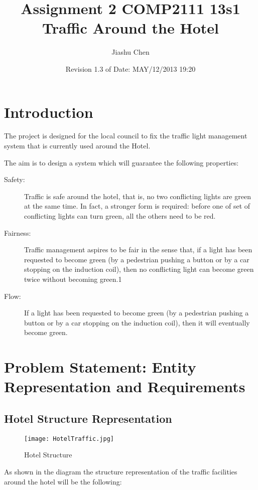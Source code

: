 \documentclass[a4paper]{article}
\title{\textbf{Assignment 2 COMP2111 13s1\\Traffic Around the Hotel}}
\author{Jiashu Chen\\
}
\date{Revision 1.3 of Date: MAY/12/2013 19:20}
\begin{document}
\thispagestyle{empty}
\maketitle
\tableofcontents
\newpage
\setcounter{page}{1}
\section{Introduction}

\indent\indent The project is designed for the local council to fix the traffic light management system that is currently used around the Hotel.

The aim is to design a system which will guarantee the following properties:
\begin{description}
\item [Safety:] Traffic is safe around the hotel, that is, no two conflicting lights are green at the same time. In fact, a stronger form is required: before one of set of conflicting lights can turn green, all the others need to be red.
\item [Fairness:] Traffic management aspires to be fair in the sense that, if a light has been requested to become green (by a pedestrian pushing a button or by a car stopping on the induction coil), then no conflicting light can become green twice without becoming green.1
\item [Flow:] If a light has been requested to become green (by a pedestrian pushing a button or by a car stopping on the induction coil), then it will eventually become green.
\end{description}

\section{Problem Statement: Entity Representation and Requirements}
\subsection{Hotel Structure Representation}

\begin{figure}[h!]
  \begin{center}
  \texttt{[image: HotelTraffic.jpg]}
  \caption{Hotel Structure}
  \end{center}
\end{figure}

\newpage
\noindent As shown in the diagram the structure representation of the traffic facilities around the hotel will be the following:\\
\end{document}
